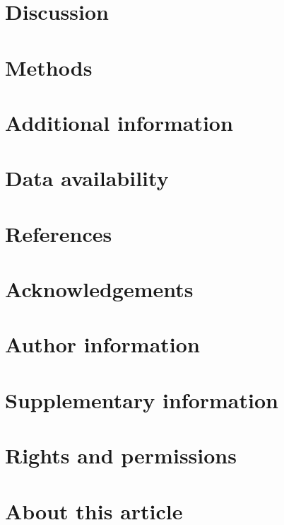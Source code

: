 \documentclass{article}
\begin{document}
\section{Discussion}
\section{Methods}
\section{Additional information}
\section{Data availability}
\section{References}
\section{Acknowledgements}
\section{Author information}
\section{Supplementary information}
\section{Rights and permissions}
\section{About this article}
\end{document}
